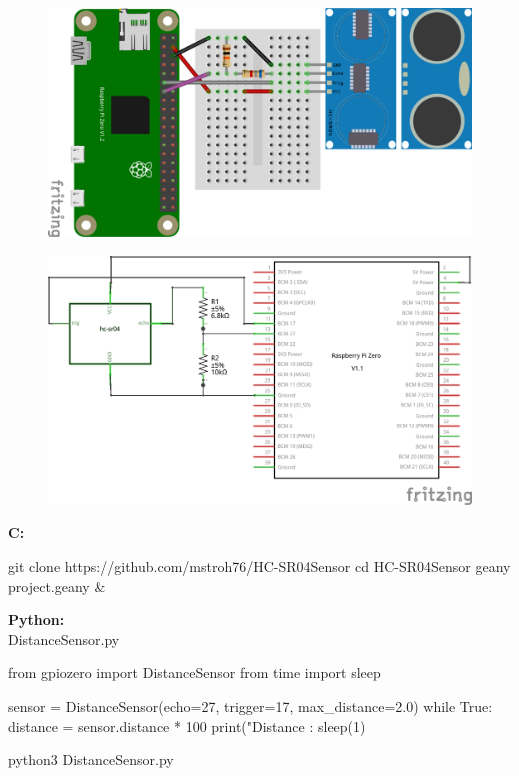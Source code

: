 

\begin{figure}[ht]
  \centering
  \includegraphics[scale=0.25]{images/HC-SR04_Steckplatine.png}	
  \label{DHT22_Steckplatine}
\end{figure}


\begin{figure}[ht]
	\centering
	\includegraphics[scale=0.25]{images/HC-SR04_Schaltplan.png}	
	\label{DHT22_Steckplatine}
\end{figure}

\textbf{C:} 

\begin{console}
	git clone https://github.com/mstroh76/HC-SR04Sensor
	cd HC-SR04Sensor
	geany project.geany & 
\end{console}

\textbf{Python:}\\

DistanceSensor.py
\begin{screensmall}
	from gpiozero import DistanceSensor
	from time import sleep
	
	sensor = DistanceSensor(echo=27, trigger=17, max_distance=2.0)
	while True:
		distance = sensor.distance * 100
		print("Distance : %
		sleep(1)	
\end{screensmall}

\begin{console}
python3 DistanceSensor.py
\end{console}